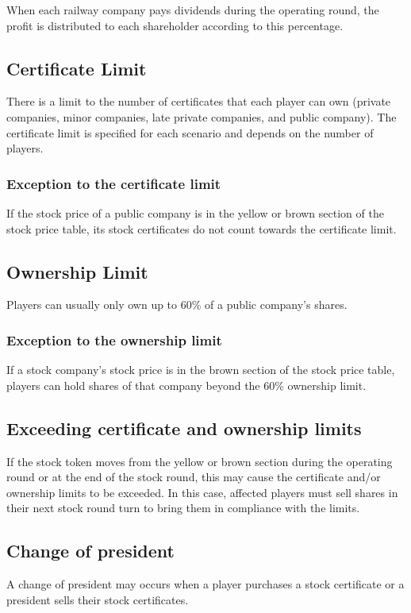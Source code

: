 \documentclass{article}
\begin{document}
\begin{CJK}{UTF8}{min}
When each railway company pays dividends during the operating round,
the profit is distributed to each shareholder according to this
percentage.

\subsection{Certificate Limit}
There is a limit to the number of certificates that each player can
own (private companies, minor companies, late private companies, and
public company). The certificate limit is specified for each scenario
and depends on the number of players.

\subsubsection{Exception to the certificate limit}
If the stock price of a public company is in the yellow or brown
section of the stock price table, its stock certificates do not count
towards the certificate limit.

\subsection{Ownership Limit}
Players can usually only own up to 60\% of a public company's
shares.

\subsubsection{Exception to the ownership limit}
If a stock company's stock price is in the brown section of the stock
price table, players can hold shares of that company beyond the 60\%
ownership limit.

\subsection{Exceeding certificate and ownership limits}
If the stock token moves from the yellow or brown section during the
operating round or at the end of the stock round, this may cause the
certificate and/or ownership limits to be exceeded. In this case,
affected players must sell shares in their next stock round turn to
bring them in compliance with the limits.

\subsection{Change of president}
A change of president may occurs when a player purchases a stock
certificate or a president sells their stock certificates.


\end{CJK}
\end{document}
